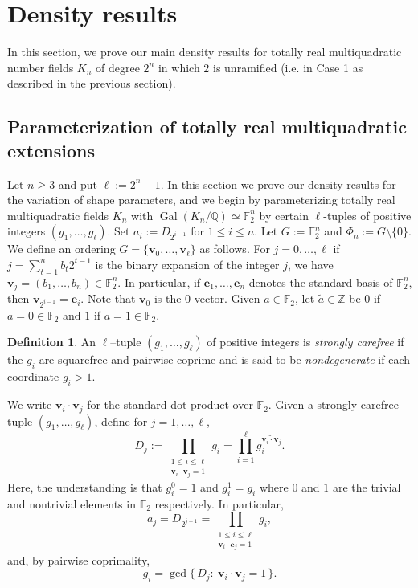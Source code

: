 \documentclass{amsart}
\newcommand{\Q}{\mathbb{Q}}
\newcommand{\F}{\mathbb{F}}
\newcommand{\op}[1]{\operatorname{#1}}
\newcommand{\Z}{\mathbb{Z}}
\theoremstyle{plain}
\theoremstyle{definition}
\newtheorem{definition}[theorem]{Definition}
\theoremstyle{remark}
\numberwithin{equation}{section}
\begin{document}
\section{Density results}
\par In this section, we prove our main density results for totally real multiquadratic number fields $K_n$ of degree $2^n$ in which $2$ is unramified (i.e. in Case 1 as described in the previous section).
\subsection{Parameterization of totally real multiquadratic extensions}
\par Let $n\ge 3$ and put $\ell:=2^n-1$. In this section we prove our density results for the variation of shape parameters, and we begin by parameterizing totally real multiquadratic fields $K_n$ with $\op{Gal}(K_n/\Q)\simeq \F_2^n$ by certain $\ell$-tuples of positive integers $(g_1, \dots, g_\ell)$. Set $a_i:=D_{2^{i-1}}$ for
$1\le i\le n$. Let $G:=\F_2^n$ and $\Phi_n:=G\setminus\{0\}$. We define an
ordering $G=\{\mathbf v_0,\dots,\mathbf v_\ell\}$ as follows. For $j=0, \dots, \ell$ if $j=\sum_{t=1}^n b_t 2^{t-1}$ is the binary expansion of the integer $j$,
we have $\mathbf v_j=(b_1,\dots,b_n)\in\F_2^n$.
In particular, if $\mathbf e_1,\dots,\mathbf e_n$ denotes the standard basis of
$\F_2^n$, then $\mathbf v_{2^{i-1}}=\mathbf e_i$. Note that $\mathbf v_0$ is the $0$ vector. Given $a\in \F_2$, let $\widetilde{a}\in \Z$ be $0$ if $a=0\in \F_2$ and $1$ if $a=1\in \F_2$. 

\begin{definition}
An $\ell$–tuple $(g_1,\dots,g_\ell)$ of positive integers is
\emph{strongly carefree} if the $g_i$ are squarefree and pairwise
coprime and is said to be \emph{nondegenerate} if each coordinate $g_i>1$.
\end{definition}
\noindent We write $\mathbf v_i\cdot \mathbf v_j$ for the standard dot product over $\F_2$.
Given a strongly carefree tuple $(g_1,\dots,g_\ell)$, define for $j=1, \dots, \ell$, 
\begin{equation}\label{eq:D-param-general}
D_j :=
\prod_{\substack{1\le i\le \ell\\ \mathbf v_i\cdot \mathbf v_j=1}}
g_i=\prod_{i=1}^\ell g_i^{\widetilde{\mathbf v_i\cdot \mathbf v_j}}.
\end{equation}
Here, the understanding is that $g_i^0=1$ and $g_i^1=g_i$ where $0$ and $1$ are the trivial and nontrivial elements in $\F_2$ respectively. In particular,
\begin{equation}\label{eq2:D-param-general}
a_j=D_{2^{j-1}}
=\prod_{\substack{1\le i\le \ell\\ \mathbf v_i\cdot \mathbf e_j=1}}
g_i,
\end{equation}
and, by pairwise coprimality,
\[
g_i=\gcd\bigl\{\,D_j:\ \mathbf v_i\cdot \mathbf v_j=1\,\bigr\}.
\]
\end{document}
